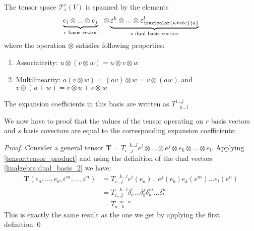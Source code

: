 	\begin{adefinition}\label{tensor:type}
    		The tensor space $\mathcal{T}^r_s(V)$ is spanned by the elements
    		\[\underbrace{e_i\otimes...\otimes e_j}_{r\text{ basis vector}}\ \ \otimes\underbrace{\varepsilon^k\otimes...\otimes \varepsilon^l_{\textcolor{white}{a}}}_{s\text{ dual basis vectors}}\]
    		where the operation $\otimes$ satisfies following properties:
        	\begin{enumerate}
        		\item Associativity: $u\otimes(v\otimes w) = u \otimes v\otimes w$
		        \item Multilinearity: $a(v\otimes w) = (av)\otimes w = v\otimes (aw)$ and $v\otimes (u+w) = v\otimes u + v\otimes w$
	        \end{enumerate}
	        The expansion coefficients in this basis are written as $T^{i...j}_{\ \ \ \ k...l}$
	\end{adefinition}

    
    	We now have to proof that the values of the tensor operating on $r$ basis vectors and $s$ basis covectors are equal to the corresponding expansion coefficients:
      	\begin{proof}
        	Consider a general tensor $\mathbf{T} = T_{i...j}^{\ \ \ \ k...l}e^i\otimes...\otimes e^j\otimes e_k\otimes...\otimes e_l$. Applying \ref{tensor:tensor_product} and using the definition of the dual vectors \ref{linalgebra:dual_basis_2} we have:
		\begin{align*}
            		\mathbf{T}(e_a, ..., e_b, \varepsilon^m, ..., \varepsilon^n) &= T_{i...j}^{\ \ \ \ k...l}e^i(e_a)...e^j(e_b)e_k(e^m)...e_l(e^n)\\
                	&= T_{i...j}^{\ \ \ \ k...l}\delta_a^i...\delta_b^j\delta_k^m...\delta_l^n\\
                	&= T_{a...b}^{\ \ \ \ m...n}
	        \end{align*}
		This is exactly the same result as the one we get by applying the first definition.\qed
      	\end{proof}
      	

